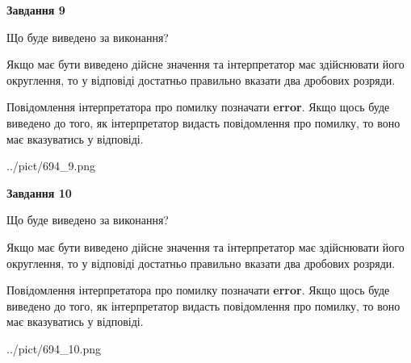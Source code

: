 \documentclass[12pt, ukrainian]{article}
\begin{document}
{\begin {Large}
{\begin {center}\textbf{Завдання 9}\end {center}}\par
Що буде виведено за виконання? \par

Якщо має бути виведено дійсне значення та інтерпретатор має здійснювати його округлення, 
то у відповіді достатньо правильно вказати два дробових розряди.

Повідомлення інтерпретатора про помилку позначати \textbf{error}.
Якщо щось буде виведено до того, як інтерпретатор видасть повідомлення про помилку, 
то воно має вказуватись у відповіді. \par

\begin{center}
	{../pict/694_9.png}
\end{center}
\newpage

{\begin {center}\textbf{Завдання 10}\end {center}}\par
Що буде виведено за виконання? \par

Якщо має бути виведено дійсне значення та інтерпретатор має здійснювати його округлення, 
то у відповіді достатньо правильно вказати два дробових розряди.

Повідомлення інтерпретатора про помилку позначати \textbf{error}.
Якщо щось буде виведено до того, як інтерпретатор видасть повідомлення про помилку, 
то воно має вказуватись у відповіді. \par

\begin{center}
	{../pict/694_10.png}
\end{center}
\newpage

\end {Large}}
\end{document}
